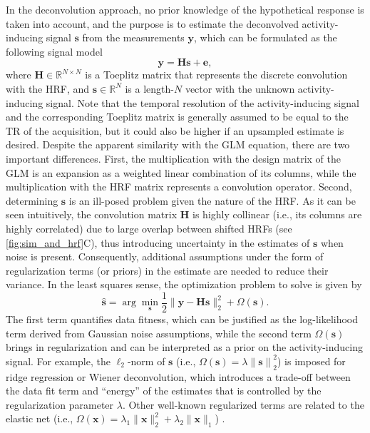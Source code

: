 In the deconvolution approach, no prior knowledge of the hypothetical response
is taken into account, and the purpose is to estimate the deconvolved
activity-inducing signal $\mathbf{s}$ from the measurements $\mathbf{y}$, which
can be formulated as the following signal model
\begin{equation}
    \label{eq:synthesis_model}
    \mathbf{y} = \mathbf{Hs} + \mathbf{e},
\end{equation}
where $\mathbf{H} \in \mathbb{R}^{N \times N}$ is a Toeplitz matrix that
represents the discrete convolution with the HRF, and $\mathbf{s} \in
\mathbb{R}^{N}$ is a length-$N$ vector with the unknown activity-inducing
signal. Note that the temporal resolution of the activity-inducing signal and
the corresponding Toeplitz matrix is generally assumed to be equal to the TR of
the acquisition, but it could also be higher if an upsampled estimate is
desired. Despite the apparent similarity with the GLM equation, there are two
important differences. First, the multiplication with the design matrix of the
GLM is an expansion as a weighted linear combination of its columns, while the
multiplication with the HRF matrix represents a convolution operator. Second,
determining $\mathbf{s}$ is an ill-posed problem given the nature of the HRF. As
it can be seen intuitively, the convolution matrix $\mathbf{H}$ is highly
collinear (i.e., its columns are highly correlated) due to large overlap between
shifted HRFs (see \cref{fig:sim_and_hrf}C), thus introducing uncertainty in the
estimates of $\mathbf{s}$ when noise is present. Consequently, additional
assumptions under the form of regularization terms (or priors) in the estimate
are needed to reduce their variance. In the least squares sense, the
optimization problem to solve is given by
\begin{equation}
    \label{eq:regularized_least_squares}
    \hat{\mathbf{s}} = \arg \min_{\mathbf{s}} \frac{1}{2} \| \mathbf{y} - \mathbf{Hs} \|_2^2 + \Omega(\mathbf{s}).
\end{equation}
The first term quantifies data fitness, which can be justified as the
log-likelihood term derived from Gaussian noise assumptions, while the second
term \(\Omega(\mathbf{s})\) brings in regularization and can be interpreted as a
prior on the activity-inducing signal. For example, the $\ell_2$-norm of
$\mathbf{s}$ (i.e., $\Omega(\mathbf{s})=\lambda \left\| \mathbf{s}\right\|_2^2$)
is imposed for ridge regression or Wiener deconvolution, which introduces a
trade-off between the data fit term and \enquote{energy} of the estimates that
is controlled by the regularization parameter $\lambda$. Other well-known
regularized terms are related to the elastic net (i.e.,
$\Omega(\mathbf{x})=\lambda_1\|\mathbf{x}\|_2^2 + \lambda_2\|\mathbf{x}\|_1$)
\citep{Zou2005Regularizationvariableselection}.

